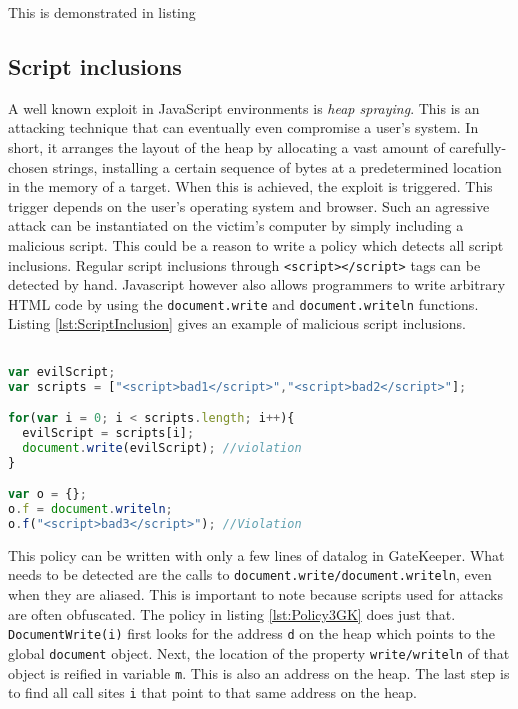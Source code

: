  This is demonstrated in listing 

\subsection{Script inclusions}

A well known exploit in JavaScript environments is \textit{heap spraying}\cite{HeapSpraying}. This is an attacking technique that can eventually even compromise a user's system. In short, it arranges the layout of the heap by allocating a vast amount of carefully-chosen strings, installing a certain sequence of bytes at a predetermined location in the memory of a target. When this is achieved, the exploit is triggered. This trigger depends on the user's operating system and browser. Such an agressive attack can be instantiated on the victim's computer by simply including a malicious script. This could be a reason to write a policy which detects all script inclusions. Regular script inclusions through \texttt{<script></script>} tags can be detected by hand. Javascript however also allows programmers to write arbitrary HTML code by using the \texttt{document.write} and \texttt{document.writeln} functions. Listing \ref{lst:ScriptInclusion} gives an example of malicious script inclusions.

\begin{lstlisting}[label={lst:ScriptInclusion},language=JavaScript,caption=Script inclusion example,mathescape=true]  % float=t?

var evilScript;
var scripts = ["<script>bad1</script>","<script>bad2</script>"];

for(var i = 0; i < scripts.length; i++){
  evilScript = scripts[i];
  document.write(evilScript); //violation
}

var o = {};
o.f = document.writeln;
o.f("<script>bad3</script>"); //Violation
\end{lstlisting}

This policy can be written with only a few lines of datalog in GateKeeper. What needs to be detected are the calls to \texttt{document.write/document.writeln}, even when they are aliased. This is important to note because scripts used for attacks are often obfuscated. The policy in listing \ref{lst:Policy3GK} does just that. \texttt{DocumentWrite(i)} first looks for the address \texttt{d} on the heap which points to the global \texttt{document} object. Next, the location of the property \texttt{write/writeln} of that object is reified in variable \texttt{m}. This is also an address on the heap. The last step is to find all call sites \texttt{i} that point to that same address on the heap. 

